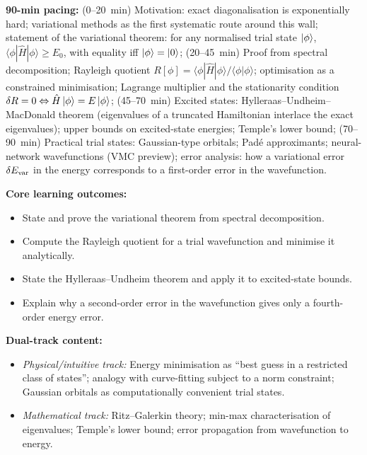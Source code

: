 \documentclass[11pt,a4paper]{article}
\begin{document}
\begin{tcolorbox}[modulebox, title={Module~II.1 --- Lecture L01: The Variational Principle}]
\textbf{90-min pacing:} (0--20~min) Motivation: exact diagonalisation is exponentially hard;
variational methods as the first systematic route around this wall;
statement of the variational theorem: for any normalised trial state $\ket{\phi}$,
$\langle\phi|\hat{H}|\phi\rangle \geq E_0$, with equality iff $\ket{\phi}=\ket{0}$;
(20--45~min) Proof from spectral decomposition; Rayleigh quotient
$R[\phi]=\langle\phi|\hat{H}|\phi\rangle/\langle\phi|\phi\rangle$;
optimisation as a constrained minimisation; Lagrange multiplier and the stationarity
condition $\delta R=0 \Leftrightarrow \hat{H}\ket{\phi}=E\ket{\phi}$;
(45--70~min) Excited states: Hylleraas--Undheim--MacDonald theorem
(eigenvalues of a truncated Hamiltonian interlace the exact eigenvalues);
upper bounds on excited-state energies;
Temple's lower bound;
(70--90~min) Practical trial states: Gaussian-type orbitals;
Pad\'e approximants; neural-network wavefunctions (VMC preview);
error analysis: how a variational error $\delta E_{\rm var}$ in the energy
corresponds to a first-order error in the wavefunction.

\medskip\textbf{Core learning outcomes:}
\begin{itemize}[leftmargin=1.4em,topsep=2pt,itemsep=1pt]
  \item State and prove the variational theorem from spectral decomposition.
  \item Compute the Rayleigh quotient for a trial wavefunction and minimise it analytically.
  \item State the Hylleraas--Undheim theorem and apply it to excited-state bounds.
  \item Explain why a second-order error in the wavefunction gives only a fourth-order energy error.
\end{itemize}

\medskip\textbf{Dual-track content:}
\begin{itemize}[leftmargin=1.4em,topsep=2pt,itemsep=1pt]
  \item \textit{Physical/intuitive track:} Energy minimisation as ``best guess in a restricted
    class of states''; analogy with curve-fitting subject to a norm constraint; Gaussian
    orbitals as computationally convenient trial states.
  \item \textit{Mathematical track:} Ritz--Galerkin theory; min-max characterisation of eigenvalues;
    Temple's lower bound; error propagation from wavefunction to energy.
\end{itemize}


\end{tcolorbox}
\end{document}
